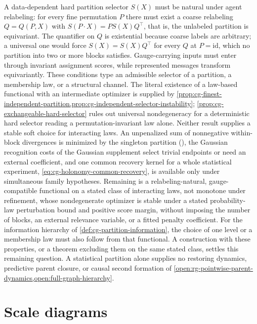 \label{eq:cg-partition-naturality}
A data-dependent hard partition selector $S(X)$ must be natural under agent relabeling: for every
fine permutation $P$ there must exist a coarse relabeling $Q=Q(P,X)$ with
$S(P\cdot X)=PS(X)Q^\top$, that is, the unlabeled partition is equivariant. The quantifier on $Q$
is existential because coarse labels are arbitrary; a universal one would force $S(X)=S(X)Q^\top$
for every $Q$ at $P=\mathrm{id}$, which no partition into two or more blocks satisfies.
Gauge-carrying inputs must enter through invariant assignment scores, while represented messages
transform equivariantly. These conditions type an admissible selector of a partition, a membership
law, or a structural channel. The literal existence of a law-based functional with an
intermediate optimizer is supplied by
\cref{prop:cg-finest-independent-partition,prop:cg-independent-selector-instability};
\cref{prop:cg-exchangeable-hard-selector} rules out universal nondegeneracy for a
deterministic hard selector reading a permutation-invariant law alone. Neither result
supplies a stable soft choice for interacting laws. An unpenalized sum of nonnegative
within-block divergences is minimized by the singleton partition
(), the Gaussian recognition costs of the Gaussian supplement
select trivial endpoints or need an external coefficient, and one common recovery kernel for a
whole statistical experiment, \eqref{eq:cg-holonomy-common-recovery}, is available only under
simultaneous family hypotheses. Remaining is a relabeling-natural, gauge-compatible
functional on a stated class of interacting laws, not monotone under refinement,
whose nondegenerate optimizer is stable under a stated probability-law perturbation
bound and positive score margin, without imposing the number of blocks, an external
relevance variable, or a fitted penalty coefficient. For the information hierarchy of
\cref{def:cg-partition-information}, the choice of one level or a membership law must
also follow from that functional. A construction with these properties, or a theorem
excluding them on the same stated class, settles this remaining question. A statistical
partition alone supplies no restoring dynamics, predictive parent closure, or causal
second formation of \cref{open:rg-pointwise-parent-dynamics,open:full-graph-hierarchy}.

\section{Scale diagrams}
\label{sec:rg-scale-category}

